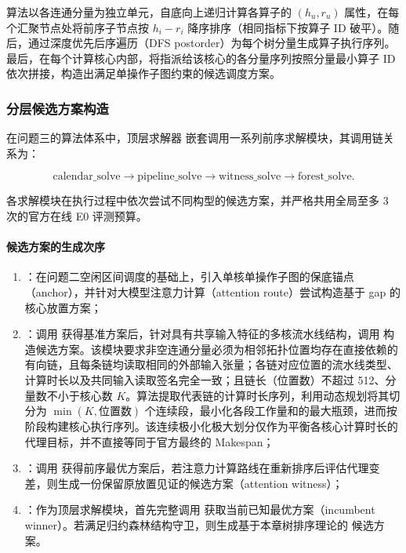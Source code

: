 \documentclass[anonymous,withtoc]{gmcm2026}
\providecommand{\tightlist}{\setlength{\itemsep}{0pt}\setlength{\parskip}{0pt}}
\begin{document}
算法以各连通分量为独立单元，自底向上递归计算各算子的 \((h_u, r_u)\) 属性，在每个汇聚节点处将前序子节点按 \(h_i - r_i\) 降序排序（相同指标下按算子 ID 破平）。随后，通过深度优先后序遍历（DFS postorder）为每个树分量生成算子执行序列。最后，在每个计算核心内部，将指派给该核心的各分量序列按照分量最小算子 ID 依次拼接，构造出满足单操作子图约束的候选调度方案。

\subsubsection{分层候选方案构造}

在问题三的算法体系中，顶层求解器 \texttt{} 嵌套调用一系列前序求解模块，其调用链关系为：

\begin{equation}
\text{calendar\_solve} \longrightarrow \text{pipeline\_solve} \longrightarrow \text{witness\_solve} \longrightarrow \text{forest\_solve}.
\end{equation}

各求解模块在执行过程中依次尝试不同构型的候选方案，并严格共用全局至多 3 次的官方在线 E0 评测预算。

\paragraph{候选方案的生成次序}

\begin{enumerate}
\def\labelenumi{\arabic{enumi}.}
\tightlist
\item
  \textbf{\texttt{}}：在问题二空闲区间调度的基础上，引入单核单操作子图的保底锚点（anchor），并针对大模型注意力计算（attention route）尝试构造基于 gap 的核心放置方案；
\item
  \textbf{\texttt{}}：调用 \texttt{} 获得基准方案后，针对具有共享输入特征的多核流水线结构，调用 \texttt{} 构造候选方案。该模块要求非空连通分量必须为相邻拓扑位置均存在直接依赖的有向链，且每条链均读取相同的外部输入张量；各链对应位置的流水线类型、计算时长以及共同输入读取签名完全一致；且链长（位置数）不超过 512、分量数不小于核心数 \(K\)。算法提取代表链的计算时长序列，利用动态规划将其切分为 \(\min(K, \text{位置数})\) 个连续段，最小化各段工作量和的最大瓶颈，进而按阶段构建核心执行序列。该连续极小化极大划分仅作为平衡各核心计算时长的代理目标，并不直接等同于官方最终的 Makespan；
\item
  \textbf{\texttt{}}：调用 \texttt{} 获得前序最优方案后，若注意力计算路线在重新排序后评估代理变差，则生成一份保留原放置见证的候选方案（attention witness）；
\item
  \textbf{\texttt{}}：作为顶层求解模块，首先完整调用 \texttt{} 获取当前已知最优方案（incumbent winner）。若满足归约森林结构守卫，则生成基于本章树排序理论的 \texttt{} 候选方案。
\end{enumerate}
\end{document}
